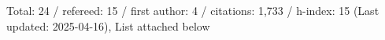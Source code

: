 Total: 24 / refereed: 15 / first author: 4 / citations: 1,733 / h-index: 15 (Last updated: 2025-04-16), List attached below